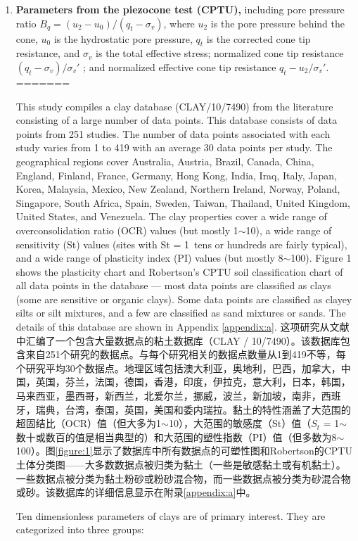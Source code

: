\begin{paracol}{2}
\begin{enumerate}
        \item \textbf{Parameters from the piezocone test (CPTU),} including pore pressure ratio $B_q=(u_2-u_0)/(q_t-\sigma_v)$, where $u_2$ is the pore pressure behind the cone, $u_0$ is the hydrostatic pore pressure, $q_t$ is the corrected cone tip resistance, and $\sigma_v$ is the total effective stress; normalized cone tip resistance $(q_t-\sigma_v)/\sigma_v'$ ; and normalized effective cone tip resistance $q_t-u_2/\sigma_v'$. 
=======
\begin{Parallel}{0.60\textwidth}{}
    \ParallelLText
    {
        This study compiles a clay database (CLAY/10/7490) from the literature consisting of a large number of data points. This database consists of data points from 251 studies. The number of data points associated with each study varies from 1 to 419 with an average 30 data points per study. The geographical regions cover Australia, Austria, Brazil, Canada, China, England, Finland, France, Germany, Hong Kong, India, Iraq, Italy, Japan, Korea, Malaysia, Mexico, New Zealand, Northern Ireland, Norway, Poland, Singapore, South Africa, Spain, Sweden, Taiwan, Thailand, United Kingdom, United States, and Venezuela. The clay properties cover a wide range of overconsolidation ratio (OCR) values (but mostly 1$\sim$10), a wide range of sensitivity (St) values (sites with St = 1~tens or hundreds are fairly typical), and a wide range of plasticity index (PI) values (but mostly 8$\sim$100). Figure 1 shows the plasticity chart and Robertson’s CPTU soil classification chart \citep{Robertson1990151} of all data points in the database — most data points are classified as clays (some are sensitive or organic clays). Some data points are classified as clayey silts or silt mixtures, and a few are classified as sand mixtures or sands. The details of this database are shown in Appendix \ref{appendix:a}.
    }
    \ParallelRText
    {
        这项研究从文献中汇编了一个包含大量数据点的粘土数据库（CLAY / 10/7490）。该数据库包含来自251个研究的数据点。与每个研究相关的数据点数量从1到419不等，每个研究平均30个数据点。地理区域包括澳大利亚，奥地利，巴西，加拿大，中国，英国，芬兰，法国，德国，香港，印度，伊拉克，意大利，日本，韩国，马来西亚，墨西哥，新西兰，北爱尔兰，挪威，波兰，新加坡，南非，西班牙，瑞典，台湾，泰国，英国，美国和委内瑞拉。黏土的特性涵盖了大范围的超固结比（OCR）值（但大多为1$\sim$10），大范围的敏感度（St）值（$S_t$ = 1$\sim$数十或数百的值是相当典型的）和大范围的塑性指数（PI）值（但多数为8$\sim$100）。图\ref{figure:1}显示了数据库中所有数据点的可塑性图和Robertson的CPTU土体分类图\citep{Robertson1990151}——大多数数据点被归类为黏土（一些是敏感黏土或有机黏土）。一些数据点被分类为黏土粉砂或粉砂混合物，而一些数据点被分类为砂混合物或砂。该数据库的详细信息显示在附录\ref{appendix:a}中。
    }
    \ParallelPar
    
    \ParallelLText
    {
        Ten dimensionless parameters of clays are of primary interest. They are categorized into three groups:

}
\end{Parallel}
\end{enumerate}
\end{paracol}
